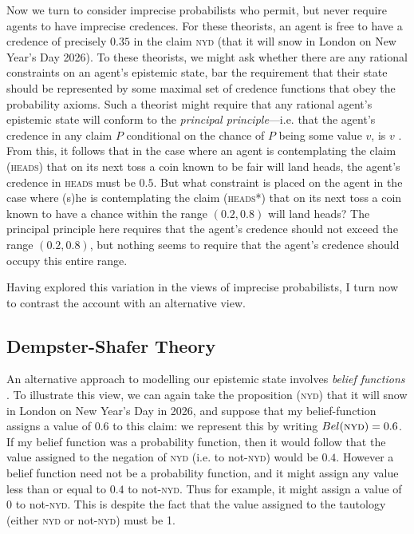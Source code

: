 Now we turn to consider imprecise probabilists who permit, but never require agents to have imprecise credences. For these theorists, an agent is free to have a credence of precisely $0.35$ in the claim \textsc{nyd} (that it will snow in London on New Year's Day 2026). To these theorists, we might ask whether there are any rational constraints on an agent's epistemic state, bar the requirement that their state should be represented by some maximal set of credence functions that obey the probability axioms. Such a theorist might require that any rational agent's epistemic state will conform to the \textit{principal principle}---i.e. that the agent's credence in any claim $P$ conditional on the chance of $P$ being some value $v$, is $v$  \citep{Lewis1980}. From this, it follows that in the case where an agent is contemplating the claim (\textsc{heads}) that on its next toss a coin known to be fair will land heads, the agent's credence in \textsc{heads} must be $0.5$. But what constraint is placed on the agent in the case where (s)he is contemplating the claim (\textsc{heads}*) that on its next toss a coin known to have a chance within the range $(0.2, 0.8)$ will land heads? The principal principle here requires that the agent's credence should not exceed the range $(0.2, 0.8)$, but nothing seems to require that the agent's credence should occupy this entire range. 

Having explored this variation in the views of imprecise probabilists, I turn now to contrast the account with an alternative view. 

\subsection{Dempster-Shafer Theory}

An alternative approach to modelling our epistemic state involves \textit{belief functions} \citep{dempster1967,dempster1968,shafer1976}. To illustrate this view, we can again take the proposition (\textsc{nyd}) that it will snow in London on New Year's Day in 2026, and suppose that my belief-function assigns a value of $0.6$ to this claim: we represent this by writing $Bel(\text{\textsc{nyd}})=0.6$. If my belief function was a probability function, then it would follow that the value assigned to the negation of \textsc{nyd} (i.e. to not-\textsc{nyd}) would be $0.4$. However a belief function need not be a probability function, and it might assign any value less than or equal to $0.4$ to not-\textsc{nyd}. Thus for example, it might assign a value of $0$ to not-\textsc{nyd}. This is despite the fact that the value assigned to the tautology (either \textsc{nyd} or not-\textsc{nyd}) must be 1. 

